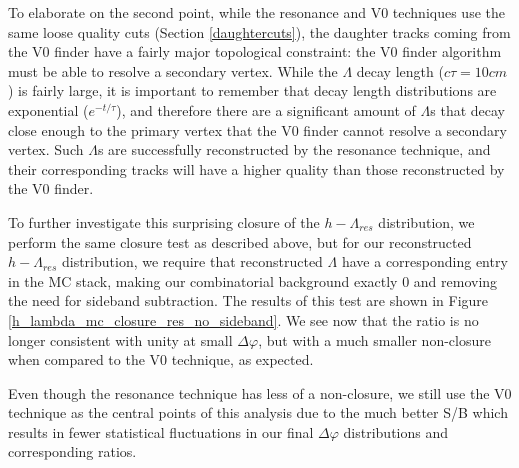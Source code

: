 \documentclass[ALICE,manyauthors]{ALICE_analysis_notes}
\begin{document}
To elaborate on the second point, while the resonance and V0 techniques use the same loose quality cuts (Section \ref{daughtercuts}), the daughter tracks coming from the V0 finder have a fairly major topological constraint: the V0 finder algorithm must be able to resolve a secondary vertex. While the $\Lambda$ decay length ($c\tau = 10 cm$) is fairly large, it is important to remember that decay length distributions are exponential ($e^{-t/\tau}$), and therefore there are a significant amount of $\Lambda$s that decay close enough to the primary vertex that the V0 finder cannot resolve a secondary vertex. Such $\Lambda$s are successfully reconstructed by the resonance technique, and their corresponding tracks will have a higher quality than those reconstructed by the V0 finder.

To further investigate this surprising closure of the $h-\Lambda_{res}$ distribution, we perform the same closure test as described above, but for our reconstructed $h-\Lambda_{res}$ distribution, we require that reconstructed $\Lambda$ have a corresponding entry in the MC stack, making our combinatorial background exactly 0 and removing the need for sideband subtraction. The results of this test are shown in Figure \ref{h_lambda_mc_closure_res_no_sideband}. We see now that the ratio is no longer consistent with unity at small $\Delta\varphi$, but with a much smaller non-closure when compared to the V0 technique, as expected.

Even though the resonance technique has less of a non-closure, we still use the V0 technique as the central points of this analysis due to the much better S/B which results in fewer statistical fluctuations in our final $\Delta\varphi$ distributions and corresponding ratios.
\end{document}
